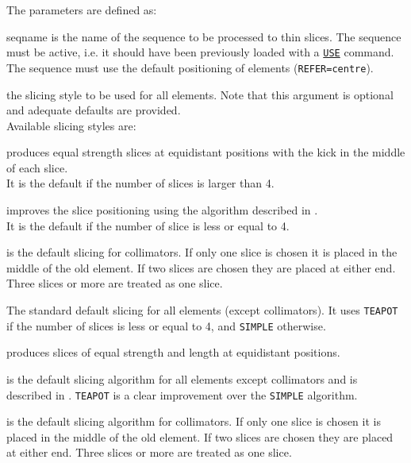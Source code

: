 The parameters are defined as: 
\begin{madlist}
    seqname is the name of the sequence to be
   processed to thin slices. The sequence must be active, i.e. it should
   have been previously loaded with a \hyperref[sec:use]{\tt USE} command.  
   The sequence must use the default positioning of elements ({\tt REFER=centre}).

    the slicing style to be used for all elements. 
   Note that this argument is optional and adequate defaults are provided.\\
   Available slicing styles are: 

\begin{5.02.04}
     \begin{madlist}
       produces equal strength slices at equidistant
     positions with the kick in the middle of each slice. \\ 
     It is the default if the number of slices is larger than 4. 

      improves the slice positioning using the algorithm
     described in \cite{burkhardt2013}.\\
     It is the default if the number of slice is less or equal to 4.

      is the default slicing for collimators. If only
     one slice is chosen it is placed in the middle of the old
     element. If two slices are chosen they are placed at either
     end. Three slices or more are treated as one slice.      

      The standard default slicing for all
     elements (except collimators). It uses {\tt TEAPOT} if the number
     of slices is less or equal to 4, and {\tt SIMPLE} otherwise.
     \end{madlist}
\end{5.02.04}

\begin{5.02.05}
     \begin{madlist}
     	 produces slices of equal strength and length at equidistant
     	positions.
     	
     	 is the default slicing algorithm for all elements 
     	except collimators and is described in \cite{burkhardt2013}. 
     	{\tt TEAPOT} is a clear improvement over the {\tt SIMPLE} algorithm.
     	
     	 is the default slicing algorithm for collimators. 
     	If only one slice is chosen it is placed in the middle of the old
     	element. If two slices are chosen they are placed at either
     	end. Three slices or more are treated as one slice. 
     \end{madlist}
\end{5.02.05}


\end{madlist}
